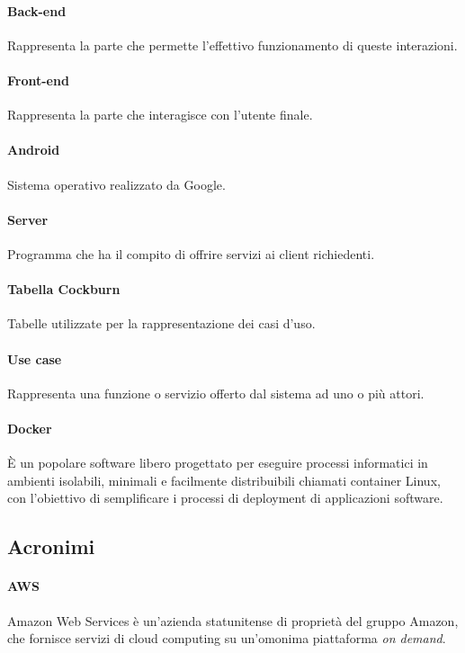 \paragraph{Back-end} Rappresenta la parte che permette l'effettivo funzionamento di queste interazioni.

\paragraph{Front-end} Rappresenta la parte che interagisce con l'utente finale.

\paragraph{Android} Sistema operativo realizzato da Google.

\paragraph{Server}  Programma che ha il compito di offrire servizi ai client richiedenti.

\paragraph{Tabella Cockburn} Tabelle utilizzate per la rappresentazione dei casi d'uso.

\paragraph{Use case} Rappresenta una funzione o servizio offerto dal sistema ad uno o più attori.

\paragraph{Docker} \`{E} un popolare software libero progettato per eseguire processi informatici in ambienti isolabili, minimali e facilmente distribuibili chiamati container Linux, con l'obiettivo di semplificare i processi di deployment di applicazioni software.
\newpage
\subsection{Acronimi}
\paragraph{AWS} Amazon Web Services è un'azienda statunitense di proprietà del gruppo Amazon, che fornisce servizi di cloud computing su un'omonima piattaforma \textit{on demand}.

